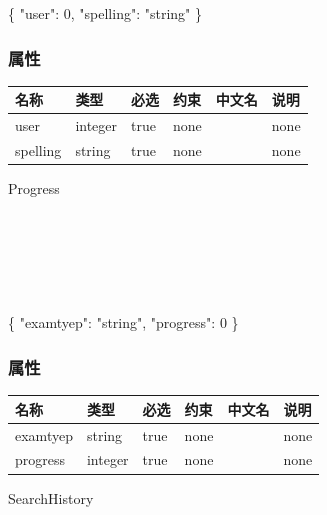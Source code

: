 \documentclass[
]{article}
\newenvironment{Shaded}{}{}
\newcommand{\DataTypeTok}[1]{\textcolor[rgb]{0.56,0.13,0.00}{#1}}
\newcommand{\DecValTok}[1]{\textcolor[rgb]{0.25,0.63,0.44}{#1}}
\newcommand{\FunctionTok}[1]{\textcolor[rgb]{0.02,0.16,0.49}{#1}}
\newcommand{\StringTok}[1]{\textcolor[rgb]{0.25,0.44,0.63}{#1}}
\begin{document}
\begin{Shaded}
\begin{Highlighting}[]
\FunctionTok{\{}
  \DataTypeTok{"user"}\FunctionTok{:} \DecValTok{0}\FunctionTok{,}
  \DataTypeTok{"spelling"}\FunctionTok{:} \StringTok{"string"}
\FunctionTok{\}}
\end{Highlighting}
\end{Shaded}

\hypertarget{ux5c5eux6027-17}{%
\subsubsection{属性}\label{ux5c5eux6027-17}}

\begin{longtable}[]{@{}llllll@{}}
\toprule
名称 & 类型 & 必选 & 约束 & 中文名 & 说明 \\
\midrule
\endhead
user & integer & true & none & & none \\
spelling & string & true & none & & none \\
\bottomrule
\end{longtable}

Progress

\strut \\
\strut \\
\strut \\

\begin{Shaded}
\begin{Highlighting}[]
\FunctionTok{\{}
  \DataTypeTok{"examtyep"}\FunctionTok{:} \StringTok{"string"}\FunctionTok{,}
  \DataTypeTok{"progress"}\FunctionTok{:} \DecValTok{0}
\FunctionTok{\}}
\end{Highlighting}
\end{Shaded}

\hypertarget{ux5c5eux6027-18}{%
\subsubsection{属性}\label{ux5c5eux6027-18}}

\begin{longtable}[]{@{}llllll@{}}
\toprule
名称 & 类型 & 必选 & 约束 & 中文名 & 说明 \\
\midrule
\endhead
examtyep & string & true & none & & none \\
progress & integer & true & none & & none \\
\bottomrule
\end{longtable}

SearchHistory
\end{document}
